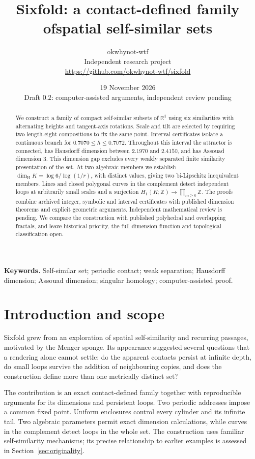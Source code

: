 \documentclass[11pt,a4paper]{article}
\title{Sixfold: a contact-defined family of\newline spatial self-similar sets}
\author{okwhynot-wtf\\\small Independent research project\\\small\url{https://github.com/okwhynot-wtf/sixfold}}
\date{19 November 2026\\\small Draft 0.2: computer-assisted arguments, independent review pending}
\theoremstyle{definition}\newtheorem{definition}[theorem]{Definition}
\theoremstyle{remark}\newtheorem{remark}[theorem]{Remark}
\newcommand{\R}{\mathbb R}\newcommand{\Z}{\mathbb Z}
\newcommand{\dimH}{\dim_{\mathrm H}}\newcommand{\dimA}{\dim_{\mathrm A}}
\begin{document}
\maketitle
\begin{abstract}
We construct a family of compact self-similar subsets of $\R^3$ using six
similarities with alternating heights and tangent-axis rotations. Scale and
tilt are selected by requiring two length-eight compositions to fix the same
point. Interval certificates isolate a continuous branch for
$0.7070\le h\le0.7072$. Throughout this interval the attractor is connected,
has Hausdorff dimension between $2.1970$ and $2.4150$, and has Assouad dimension
$3$. This dimension gap excludes every weakly separated finite similarity
presentation of the set. At two algebraic members we establish
$\dimH K=\log6/\log(1/r)$, with distinct values, giving two bi-Lipschitz
inequivalent members. Lines and closed polygonal curves in the complement
detect independent loops at arbitrarily small scales and a surjection
$H_1(K;\Z)\to\prod_{m\ge0}\Z$. The proofs combine archived integer, symbolic
and interval certificates with published dimension theorems and explicit
geometric arguments. Independent mathematical review is pending. We compare
the construction with published polyhedral and overlapping fractals, and leave
historical priority, the full dimension function and topological classification
open.
\end{abstract}

\noindent\textbf{Keywords.} Self-similar set; periodic contact; weak separation;
Hausdorff dimension; Assouad dimension; singular homology; computer-assisted proof.

\section{Introduction and scope}
Sixfold grew from an exploration of spatial self-similarity and recurring
passages, motivated by the Menger sponge. Its appearance suggested several
questions that a rendering alone cannot settle: do the apparent contacts persist
at infinite depth, do small loops survive the addition of neighbouring copies,
and does the construction define more than one metrically distinct set?

The contribution is an exact contact-defined family together with reproducible
arguments for its dimensions and persistent loops. Two periodic addresses
impose a common fixed point. Uniform enclosures control every cylinder and
its infinite tail. Two algebraic parameters permit exact dimension
calculations, while curves in the complement detect loops in the whole set.
The construction uses familiar self-similarity mechanisms; its precise
relationship to earlier examples is assessed in Section~\ref{sec:originality}.
\end{document}
